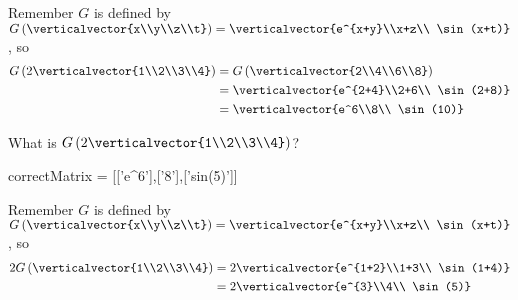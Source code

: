 \documentclass{ximera}
\begin{document}
\begin{question}
\begin{solution}
\begin{hint}
\begin{question}
        	\begin{solution}
		\begin{hint}
			Remember $G$ is defined by $G\left( \verticalvector{x\\y\\z\\t}\right) =\verticalvector{e^{x+y}\\x+z\\ \sin(x+t)}$, so
			\begin{align*}
				G\left( 2\verticalvector{1\\2\\3\\4} \right) &= G\left( \verticalvector{2\\4\\6\\8}\right)\\
					&=\verticalvector{e^{2+4}\\2+6\\ \sin(2+8)}\\
					&=\verticalvector{e^6\\8\\ \sin(10)}
			\end{align*}
		\end{hint}
        	 What is $G\left( 2\verticalvector{1\\2\\3\\4}\right)$?
        	 \begin{matrix-answer}[name=v]
    			  correctMatrix = [['e^6'],['8'],['sin(5)']]
        	 \end{matrix-answer}
        	\end{solution}
        	\begin{solution}
		\begin{hint}
				Remember $G$ is defined by $G\left( \verticalvector{x\\y\\z\\t}\right) =\verticalvector{e^{x+y}\\x+z\\ \sin(x+t)}$, so
			\begin{align*}
				2G\left( \verticalvector{1\\2\\3\\4} \right) &= 2\verticalvector{e^{1+2}\\1+3\\ \sin(1+4)}\\
					&=2\verticalvector{e^{3}\\4\\ \sin(5)}\\

\end{align*}
\end{hint}
\end{solution}
\end{question}
\end{hint}
\end{solution}
\end{question}
\end{document}
